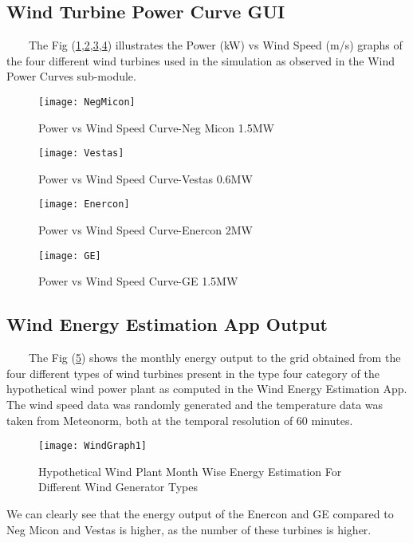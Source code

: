 \subsection{Wind Turbine Power Curve GUI}
\
\
\
\
The Fig (\ref{WinResImg7},\ref{WinResImg8},\ref{WinResImg9},\ref{WinResImg10}) illustrates the Power (kW) vs Wind Speed (m/s) graphs of the four different wind turbines used in the simulation as observed in the Wind Power Curves sub-module.

\begin{figure}[H]
\centering
\texttt{[image: NegMicon]}
\caption{Power vs Wind Speed Curve-Neg Micon 1.5MW}
\label{WinResImg7} %
\end{figure}

\begin{figure}[H]
\centering
\texttt{[image: Vestas]}
\caption{Power vs Wind Speed Curve-Vestas 0.6MW}
\label{WinResImg8} %
\end{figure}

\begin{figure}[H]
\centering
\texttt{[image: Enercon]}
\caption{Power vs Wind Speed Curve-Enercon 2MW }
\label{WinResImg9} %
\end{figure}

\begin{figure}[H]
\centering
\texttt{[image: GE]}
\caption{Power vs Wind Speed Curve-GE 1.5MW}
\label{WinResImg10} %
\end{figure}


\subsection{Wind Energy Estimation App Output}
\
\
\
\
The Fig (\ref{WinResImg11}) shows the monthly energy output to the grid obtained from the four different types of wind turbines present in the type four category of the hypothetical wind power plant as computed in the Wind Energy Estimation App. The wind speed data was randomly generated and the temperature data was taken from Meteonorm, both at the temporal resolution of 60 minutes.

\begin{figure}[H]
\centering
\texttt{[image: WindGraph1]}
\caption{Hypothetical Wind Plant Month Wise Energy Estimation For Different Wind Generator Types}
\label{WinResImg11} %
\end{figure}

We can clearly see that the energy output of the Enercon and GE  compared to Neg Micon and Vestas is higher, as the number of these turbines is higher.




